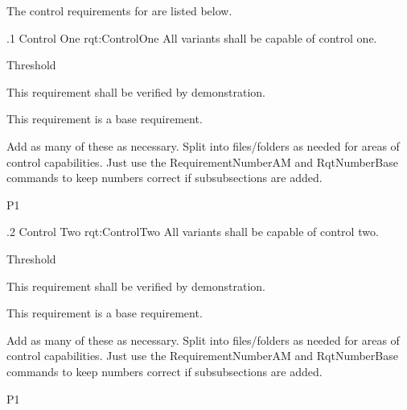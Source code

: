 The control requirements for \ThisSystem are listed below.

\ONERQMTVKPP
{\RqtNumberBase.1}
{Control One}
{rqt:ControlOne}
{All \ThisSys variants shall be capable of \TBD control one.}
{
	\item [Phase 1] Threshold
}
{This requirement shall be verified by demonstration.}
{
	\item [N/A] This requirement is a base requirement.
}
{
  \item Add as many of these as necessary.  Split into files/folders as needed for areas of control capabilities. Just use the RequirementNumberAM and RqtNumberBase commands to keep numbers correct if subsubsections are added.
}
{P1}

\ONERQMTVKPP
{\RqtNumberBase.2}
{Control Two}
{rqt:ControlTwo}
{All \ThisSys variants shall be capable of \TBD control two.}
{
	\item [Phase 1] Threshold
}
{This requirement shall be verified by demonstration.}
{
	\item [N/A] This requirement is a base requirement.
}
{
  \item Add as many of these as necessary.  Split into files/folders as needed for areas of control capabilities. Just use the RequirementNumberAM and RqtNumberBase commands to keep numbers correct if subsubsections are added.
}
{P1}
